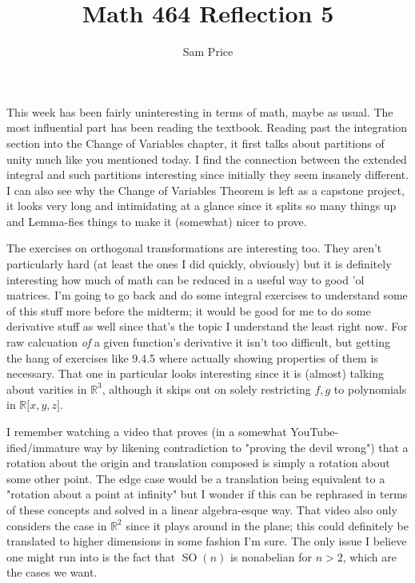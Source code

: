 \documentclass[12pt]{article}
\author{Sam Price}
\date{}%
\title{Math 464 Reflection 5}
\begin{document}
\maketitle

This week has been fairly uninteresting in terms of math, maybe as usual.
The most influential part has been reading the textbook.
Reading past the integration section into the Change of Variables chapter,
it first talks about partitions of unity much like you mentioned today.
I find the connection between the extended integral and such partitions interesting
since initially they seem insanely different.
I can also see why the Change of Variables Theorem is left as a capstone project,
it looks very long and intimidating at a glance since it splits so many things up
and Lemma-fies things to make it (somewhat) nicer to prove.


The exercises on orthogonal transformations are interesting too.
They aren't particularly hard (at least the ones I did quickly, obviously)
but it is definitely interesting how much of math can be reduced in a useful way
to good 'ol matrices. I'm going to go back and do some integral exercises to understand
some of this stuff more before the midterm; it would be good for me to do some
derivative stuff as well since that's the topic I understand the least right now.
For raw calcuation \emph{of} a given function's derivative it isn't too difficult,
but getting the hang of exercises like 9.4.5 where actually showing properties of them
is necessary. That one in particular looks interesting since it is (almost) talking
about varities in $\mathbb{R}^3$, although it skips out on solely restricting
$f, g$ to polynomials in $\mathbb{R}\lbrack x, y, z\rbrack$.


I remember watching a video that proves
(in a somewhat YouTube-ified/immature way by likening contradiction to "proving the devil wrong")
that a rotation about the origin and translation composed
is simply a rotation about some other point.
The edge case would be a translation being equivalent to a "rotation about a point at infinity"
but I wonder if this can be rephrased in terms of these concepts and solved in a linear
algebra-esque way. That video also only considers the case in $\mathbb{R}^2$ since it plays
around in the plane; this could definitely be translated to higher dimensions in some fashion I'm sure.
The only issue I believe one might run into is the fact that $\operatorname{SO}(n)$
is nonabelian for $n > 2$, which are the cases we want.
\end{document}
